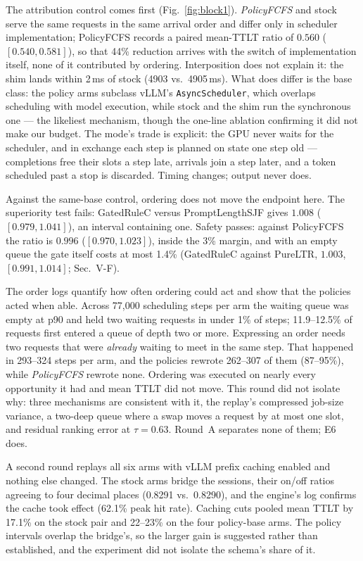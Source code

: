 The attribution control comes first (Fig.~\ref{fig:block1}).
\emph{PolicyFCFS} and stock serve the same requests in the same arrival
order and differ only in scheduler implementation; PolicyFCFS records a
paired mean-TTLT ratio of $0.560$ ($[0.540, 0.581]$), so that 44\% reduction
arrives with the switch of implementation itself, none of it contributed by
ordering. Interposition does not explain it: the shim lands within 2\,ms of
stock (4903 vs.\ 4905\,ms). What does differ is the base class: the policy
arms subclass vLLM's \texttt{AsyncScheduler}, which overlaps scheduling with
model execution, while stock and the shim run the synchronous one --- the
likeliest mechanism, though the one-line ablation confirming it did not make
our budget. The mode's trade is explicit: the GPU never waits for the
scheduler, and in exchange each step is planned on state one step old ---
completions free their slots a step late, arrivals join a step later, and a
token scheduled past a stop is discarded. Timing changes; output never does.

Against the same-base control, ordering does not move the endpoint here. The
superiority test fails: GatedRuleC versus PromptLengthSJF gives $1.008$
($[0.979, 1.041]$), an interval containing one. Safety passes: against
PolicyFCFS the ratio is $0.996$ ($[0.970, 1.023]$), inside the 3\% margin,
and with an empty queue the gate itself costs at most 1.4\% (GatedRuleC against
PureLTR, $1.003$, $[0.991, 1.014]$; Sec.~V-F).

The order logs quantify how often ordering could act and show that the
policies acted when able. Across 77{,}000 scheduling steps per arm the
waiting queue was empty at p90 and held two waiting requests in under 1\% of
steps; 11.9--12.5\% of requests first entered a queue of depth two or more.
Expressing an order needs two requests that were \emph{already} waiting to
meet in the same step. That happened in 293--324 steps per arm, and the
policies rewrote 262--307 of them (87--95\%), while \emph{PolicyFCFS}
rewrote none. Ordering was executed on nearly every opportunity it had and
mean TTLT did not move. This round did not isolate why: three mechanisms are
consistent with it, the replay's compressed job-size variance, a two-deep
queue where a swap moves a request by at most one slot, and residual ranking
error at $\tau{=}0.63$. Round~A separates none of them; E6 does.

A second round replays all six arms with vLLM prefix caching enabled and
nothing else changed. The stock arms bridge the sessions, their on/off
ratios agreeing to four decimal places (0.8291 vs.\ 0.8290), and the
engine's log confirms the cache took effect (62.1\% peak hit rate). Caching
cuts pooled mean TTLT by 17.1\% on the stock pair and 22--23\% on the four
policy-base arms. The policy intervals overlap the bridge's, so the larger
gain is suggested rather than established, and the experiment did not
isolate the schema's share of it.

